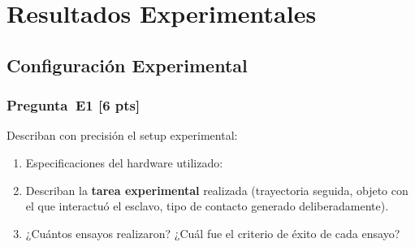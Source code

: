 \documentclass[journal,10pt,twoside]{IEEEtran}
\newcommand{\pts}[1]{\textcolor{tec_red}{\textbf{[#1 pts]}}}
\begin{document}
\section{Resultados Experimentales}
\label{sec:experiments}

\subsection{Configuración Experimental}

\subsubsection*{Pregunta~E1 \pts{6}}
Describan con precisión el setup experimental:
\begin{enumerate}[label=(\alph*)]
  \item Especificaciones del hardware utilizado:
  \smallskip
  \smallskip
  \item Describan la \textbf{tarea experimental} realizada
        (trayectoria seguida, objeto con el que interactuó el esclavo,
        tipo de contacto generado deliberadamente).
  \item ¿Cuántos ensayos realizaron? ¿Cuál fue el criterio de éxito
        de cada ensayo?
\end{enumerate}
\end{document}
